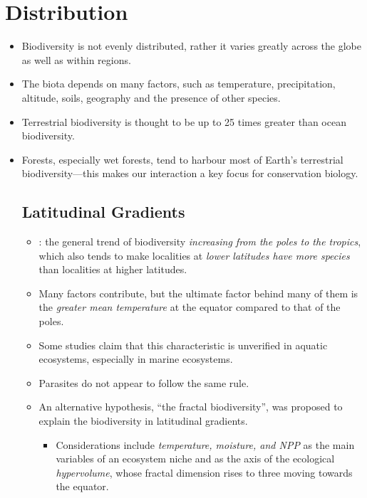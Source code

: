 \documentclass{inVerba-notes}
\begin{document}
\section{Distribution}\label{Distributions}
\begin{itemize}
    \item Biodiversity is not evenly distributed, rather it varies greatly across the globe as well as within regions.
    \item The biota depends on many factors, such as temperature, precipitation, altitude, soils, geography and the presence of other species.
    \item Terrestrial biodiversity is thought to be up to 25 times greater than ocean biodiversity.
    \item Forests, especially wet forests, tend to harbour most of Earth's terrestrial biodiversity---this makes our interaction a key focus for conservation biology.
    
    \subsection{Latitudinal Gradients}\label{Latitudinal Gradients}
    \begin{itemize}
        \item {}: the general trend of biodiversity \emph{increasing from the poles to the tropics}, which also tends to make localities at \emph{lower latitudes have more species} than localities at higher latitudes.
        \item Many factors contribute, but the ultimate factor behind many of them is the \emph{greater mean temperature} at the equator compared to that of the poles.
        \item Some studies claim that this characteristic is unverified in aquatic ecosystems, especially in marine ecosystems. 
        \item Parasites do not appear to follow the same rule.
        \item An alternative hypothesis, ``the fractal biodiversity'', was proposed to explain the biodiversity in latitudinal gradients.
            \begin{itemize}
                \item Considerations include \emph{temperature, moisture, and NPP} as the main variables of an ecosystem niche and as the axis of the ecological \emph{hypervolume}, whose fractal dimension rises to three moving towards the equator.
            \end{itemize}
    \end{itemize}
    

\end{itemize}
\end{document}
